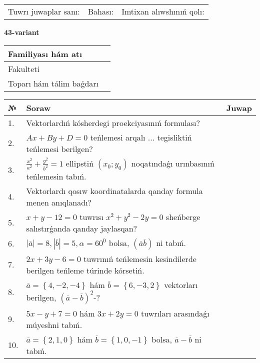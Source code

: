 \documentclass{article}
\begin{document}
\vspace{1cm}

\begin{tabular}{lll}
Tuwrı juwaplar sanı: \underline{\hspace{1.5cm}} & 
Bahası: \underline{\hspace{1.5cm}} & 
Imtixan alıwshınıń qolı: \underline{\hspace{2cm}} \\
\end{tabular}

\egroup

\newpage


\textbf{43-variant}\\

\bgroup
\def\arraystretch{1.6} %

\begin{tabular}{|m{5.7cm}|m{9.5cm}|}
\hline
Familiyası hám atı & \\
\hline
Fakulteti  & \\
\hline
Toparı hám tálim baǵdarı  & \\
\hline
\end{tabular}

\vspace{1cm}

\begin{tabular}{|m{0.7cm}|m{10cm}|m{4cm}|}
\hline
№ & Soraw & Juwap \\
\hline
1. & Vektorlardıń kósherdegi proekciyasınıń formulası? &  \\
\hline
2. & $Ax+By+D=0$ teńlemesi arqalı ... tegisliktiń teńlemesi berilgen? &  \\
\hline
3. & $\frac{x^2}{a^2}+\frac{y^2}{b^2}=1$ ellipstiń $(x_0;y_0)$ noqatındaǵı urınbasınıń teńlemesin tabıń. &  \\
\hline
4. & Vektorlardı qosıw koordinatalarda qanday formula menen anıqlanadı? &  \\
\hline
5. & $x+y-12=0$ tuwrısı $x^{2}+y^{2}-2y=0$ sheńberge salıstırǵanda qanday jaylasqan? &  \\
\hline
6. & $\left| \overline{a} \right|=8, \left| \overline{b} \right|=5, \alpha=60^{0}$ bolsa, $( \overline{a}\overline{b} )$ ni tabıń. &  \\
\hline
7. & $2x+3y-6=0$ tuwrınıń teńlemesin kesindilerde berilgen teńleme túrinde kórsetiń. &  \\
\hline
8. & $\overline{a}=\left\{ 4,-2,-4 \right\}$ hám $\overline{b}=\left\{ 6,-3, 2 \right\}$ vektorları berilgen, $(\overline{a}-\overline{b}) ^{2}$-? &  \\
\hline
9. & $5x-y+7=0$ hám $3x+2y=0$ tuwrıları arasındaǵı múyeshni tabıń. &  \\
\hline
10. & $\overline{a}=\left\{ 2, 1, 0 \right\}$ hám $\overline{b}=\left\{ 1, 0,-1 \right\}$ bolsa, $\overline{a}-\overline{b}$ ni tabıń. &  \\
\hline
\end{tabular}
\end{document}
